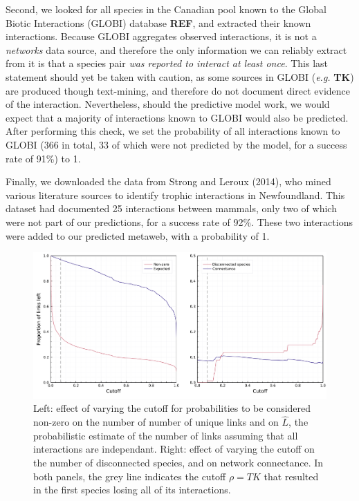 \documentclass[11pt]{article}
\makeatletter
\def\maxwidth{\ifdim\Gin@nat@width>\linewidth\linewidth
\else\Gin@nat@width\fi}
\let\Oldincludegraphics\includegraphics
\renewcommand{\includegraphics}[1]{\Oldincludegraphics[width=\maxwidth]{#1}}
\makeatother
\begin{document}
Second, we looked for all species in the Canadian pool known to the
Global Biotic Interactions (GLOBI) database \textbf{REF}, and extracted
their known interactions. Because GLOBI aggregates observed
interactions, it is not a \emph{networks} data source, and therefore the
only information we can reliably extract from it is that a species pair
\emph{was reported to interact at least once}. This last statement
should yet be taken with caution, as some sources in GLOBI (\emph{e.g.}
\textbf{TK}) are produced though text-mining, and therefore do not
document direct evidence of the interaction. Nevertheless, should the
predictive model work, we would expect that a majority of interactions
known to GLOBI would also be predicted. After performing this check, we
set the probability of all interactions known to GLOBI (366 in total, 33
of which were not predicted by the model, for a success rate of 91\%) to
1.

Finally, we downloaded the data from Strong and Leroux (2014), who mined
various literature sources to identify trophic interactions in
Newfoundland. This dataset had documented 25 interactions between
mammals, only two of which were not part of our predictions, for a
success rate of 92\%. These two interactions were added to our predicted
metaweb, with a probability of 1.

\begin{figure}
\hypertarget{fig:thresholds}{%
\centering
\includegraphics{figures/figure-cutoffs.png}
\caption{Left: effect of varying the cutoff for probabilities to be
considered non-zero on the number of number of unique links and on
\(\hat{L}\), the probabilistic estimate of the number of links assuming
that all interactions are independant. Right: effect of varying the
cutoff on the number of disconnected species, and on network
connectance. In both panels, the grey line indicates the cutoff
\(\rho = TK\) that resulted in the first species losing all of its
interactions.}\label{fig:thresholds}
}
\end{figure}
\end{document}
